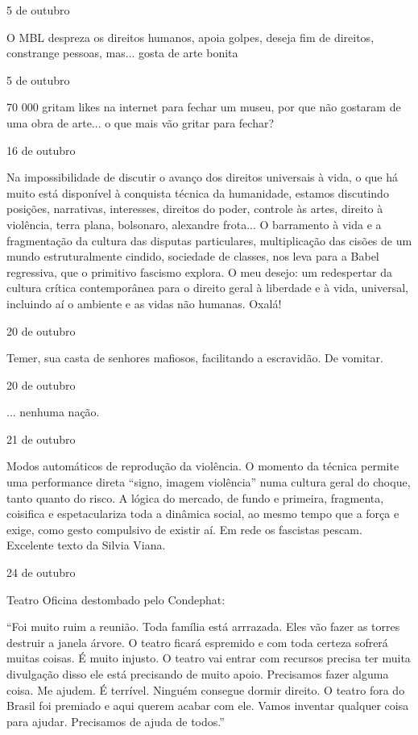 5 de outubro

O MBL despreza os direitos humanos, apoia golpes, deseja fim de
direitos, constrange pessoas, mas... gosta de arte bonita

5 de outubro

70 000 gritam likes na internet para fechar um museu, por que não
gostaram de uma obra de arte... o que mais vão gritar para fechar?

16 de outubro

Na impossibilidade de discutir o avanço dos direitos universais à vida,
o que há muito está disponível à conquista técnica da humanidade,
estamos discutindo posições, narrativas, interesses, direitos do poder,
controle às artes, direito à violência, terra plana, bolsonaro,
alexandre frota... O barramento à vida e a fragmentação da cultura das
disputas particulares, multiplicação das cisões de um mundo
estruturalmente cindido, sociedade de classes, nos leva para a Babel
regressiva, que o primitivo fascismo explora. O meu desejo: um
redespertar da cultura crítica contemporânea para o direito geral à
liberdade e à vida, universal, incluindo aí o ambiente e as vidas não
humanas. Oxalá!

20 de outubro

Temer, sua casta de senhores mafiosos, facilitando a escravidão. De
vomitar.

20 de outubro

... nenhuma nação.

21 de outubro

Modos automáticos de reprodução da violência. O momento da técnica
permite uma performance direta ``signo, imagem violência'' numa cultura
geral do choque, tanto quanto do risco. A lógica do mercado, de fundo e
primeira, fragmenta, coisifica e espetaculariza toda a dinâmica social,
ao mesmo tempo que a força e exige, como gesto compulsivo de existir aí.
Em rede os fascistas pescam. Excelente texto da Silvia Viana.

24 de outubro

Teatro Oficina destombado pelo Condephat:

``Foi muito ruim a reunião. Toda família está arrrazada. Eles vão fazer
as torres destruir a janela árvore. O teatro ficará espremido e com toda
certeza sofrerá muitas coisas. É muito injusto. O teatro vai entrar com
recursos precisa ter muita divulgação disso ele está precisando de muito
apoio. Precisamos fazer alguma coisa. Me ajudem. É terrível. Ninguém
consegue dormir direito. O teatro fora do Brasil foi premiado e aqui
querem acabar com ele. Vamos inventar qualquer coisa para ajudar.
Precisamos de ajuda de todos.''

